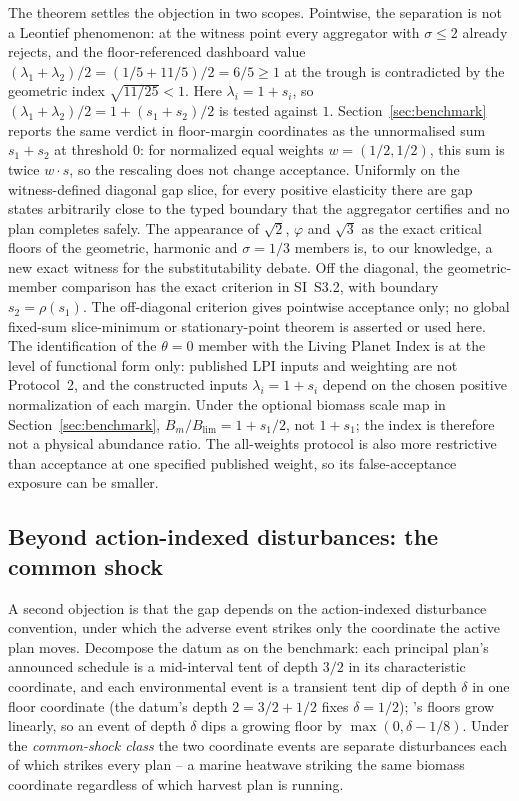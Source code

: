 The theorem settles the objection in two scopes. Pointwise, the separation is not a Leontief phenomenon: at the witness point every aggregator with $\sigma\le2$ already rejects, and the floor-referenced dashboard value $(\lambda_1+\lambda_2)/2=(1/5+11/5)/2=6/5\ge1$ at the trough is contradicted by the geometric index $\sqrt{11/25}<1$. Here $\lambda_i=1+s_i$, so $(\lambda_1+\lambda_2)/2=1+(s_1+s_2)/2$ is tested against $1$. Section~\ref{sec:benchmark} reports the same verdict in floor-margin coordinates as the unnormalised sum $s_1+s_2$ at threshold $0$: for normalized equal weights $w=(1/2,1/2)$, this sum is twice $w\cdot s$, so the rescaling does not change acceptance. Uniformly on the witness-defined diagonal gap slice, for every positive elasticity there are gap states arbitrarily close to the typed boundary that the aggregator certifies and no plan completes safely. The appearance of $\sqrt2$, $\varphi$ and $\sqrt3$ as the exact critical floors of the geometric, harmonic and $\sigma=1/3$ members is, to our knowledge, a new exact witness for the substitutability debate. Off the diagonal, the geometric-member comparison has the exact criterion in SI~S3.2, with boundary $s_2=\rho(s_1)$. The off-diagonal criterion gives pointwise acceptance only; no global fixed-sum slice-minimum or stationary-point theorem is asserted or used here. The identification of the $\theta=0$ member with the Living Planet Index is at the level of functional form only: published LPI inputs and weighting are not Protocol~2, and the constructed inputs $\lambda_i=1+s_i$ depend on the chosen positive normalization of each margin. Under the optional biomass scale map in Section~\ref{sec:benchmark}, $B_m/B_{\mathrm{lim}}=1+s_1/2$, not $1+s_1$; the index is therefore not a physical abundance ratio. The all-weights protocol is also more restrictive than acceptance at one specified published weight, so its false-acceptance exposure can be smaller.

\subsection{Beyond action-indexed disturbances: the common shock}\label{sec:commonshock}

A second objection is that the gap depends on the action-indexed disturbance convention, under which the adverse event strikes only the coordinate the active plan moves. Decompose the datum as on the benchmark: each principal plan's announced schedule is a mid-interval tent of depth $3/2$ in its characteristic coordinate, and each environmental event is a transient tent dip of depth $\delta$ in one floor coordinate (the datum's depth $2=3/2+1/2$ fixes $\delta=1/2$); 's floors grow linearly, so an event of depth $\delta$ dips a growing floor by $\max(0,\delta-1/8)$. Under the \emph{common-shock class} the two coordinate events are separate disturbances each of which strikes every plan -- a marine heatwave striking the same biomass coordinate regardless of which harvest plan is running.

